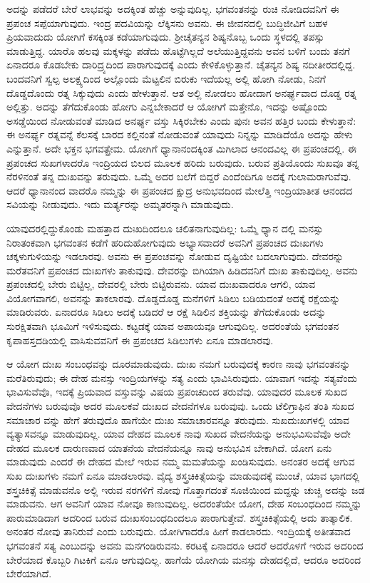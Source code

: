 ಅದನ್ನು ಪಡೆದರೆ ಬೇರೆ ಲಾಭವನ್ನು ಅದಕ್ಕಿಂತ ಹೆಚ್ಚು ಅನ್ನುವುದಿಲ್ಲ. ಭಗವಂತನನ್ನು ರುಚಿ ನೋಡಿದವನಿಗೆ ಈ ಪ್ರಪಂಚ ಸಪ್ಪೆಯಾಗುವುದು. ಇಂದ್ರ ಪದವಿಯನ್ನು ಲೆಕ್ಕಿಸನು ಅವನು. ಈ ಜೀವನದಲ್ಲಿ ಬುದ್ಧಿಜೀವಿಗೆ ಬಹಳ ಪ್ರಿಯವಾದುದು ಯೋಗಿಗೆ ಕಸಕ್ಕಿಂತ ಕಡೆಯಾಗುವುದು. ಶ‍್ರೀಚೈತನ್ಯನ ಶಿಷ್ಯನೊಬ್ಬ ಒಂದು ಸ್ಥಳದಲ್ಲಿ ತಪಸ್ಸು ಮಾಡುತ್ತಿದ್ದ. ಯಾರೊ ಹಲವು ಮಕ್ಕಳನ್ನು ಪಡೆದು ಹೊಟ್ಟೆಗಿಲ್ಲದೆ ಅಲೆಯುತ್ತಿದ್ದವನು ಅವನ ಬಳಿಗೆ ಬಂದು ತನಗೆ ಏನಾದರೂ ಕೊಡಬೇಕು ದಾರಿದ್ರ್ಯದಿಂದ ಪಾರಾಗುವುದಕ್ಕೆ ಎಂದು ಕೇಳಿಕೊಳ್ಳುತ್ತಾನೆ. ಚೈತನ್ಯನ ಶಿಷ್ಯ ನದೀತೀರದಲ್ಲಿದ್ದ. ಬಂದವನಿಗೆ ಸ್ವಲ್ಪ ಅಲಕ್ಷ್ಯದಿಂದ ಅಲ್ಲೊಂದು ಮೆಟ್ಟಲಿನ ಬಿರುಕು ಇದೆಯಲ್ಲ ಅಲ್ಲಿ ಹೋಗಿ ನೋಡು, ನಿನಗೆ ದೊಡ್ಡದೊಂದು ರತ್ನ ಸಿಕ್ಕುವುದು ಎಂದು ಹೇಳುತ್ತಾನೆ. ಆತ ಅಲ್ಲಿ ನೋಡಲು ಹೋದಾಗ ಅನರ್ಘ್ಯವಾದ ದೊಡ್ಡ ರತ್ನ ಅಲ್ಲಿತ್ತು. ಅದನ್ನು ತೆಗೆದುಕೊಂಡು ಹೋಗು ಎನ್ನಬೇಕಾದರೆ ಆ ಯೋಗಿಗೆ ಮತ್ತೇನೊ, ಇದನ್ನು ಅಷ್ಟೊಂದು ಅಸಡ್ಡೆಯಿಂದ ನೋಡುವಂತೆ ಮಾಡಿದ ಅನರ್ಘ್ಯ ವಸ್ತು ಸಿಕ್ಕಿರಬೇಕು ಎಂದು ಪುನಃ ಅವನ ಹತ್ತಿರ ಬಂದು ಕೇಳುತ್ತಾನೆ: ಈ ಅನರ್ಘ್ಯ ರತ್ನವನ್ನೆ ಕೆಲಸಕ್ಕೆ ಬಾರದ ಕಲ್ಲಿನಂತೆ ನೋಡುವಂತೆ ಯಾವುದು ನಿನ್ನನ್ನು ಮಾಡಿದೆಯೊ ಅದನ್ನು ಹೇಳು ಎನ್ನುತ್ತಾನೆ. ಅದೇ ಭಕ್ತನ ಭಗವತ್ಪ್ರೇಮ. ಯೋಗಿಗೆ ಧ್ಯಾನಾನಂದಕ್ಕಿಂತ ಮಿಗಿಲಾದ ಆನಂದವಿಲ್ಲ ಈ ಪ್ರಪಂಚದಲ್ಲಿ. ಈ ಪ್ರಪಂಚದ ಸುಖಗಳಾದರೊ ಇಂದ್ರಿಯದ ಬಿಲದ ಮೂಲಕ ಹರಿದು ಬರುವುದು. ಬರುವ ಪ್ರತಿಯೊಂದು ಸುಖವೂ ತನ್ನ ನೆರಳಿನಂತೆ ತನ್ನ ದುಃಖವನ್ನು ತರುವುದು. ಒಮ್ಮೆ ಅದರ ಬಲೆಗೆ ಬಿದ್ದರೆ ಎಂದೆಂದಿಗೂ ಅದಕ್ಕೆ ಗುಲಾಮರಾಗುವೆವು. ಆದರೆ ಧ್ಯಾನಾನಂದ ವಾದರೊ ನಮ್ಮನ್ನು ಈ ಪ್ರಪಂಚದ ಕ್ಷುದ್ರ ಅನುಭವದಿಂದ ಮೇಲೆತ್ತಿ ಇಂದ್ರಿಯಾತೀತ ಆನಂದದ ಸವಿಯನ್ನು ನೀಡುವುದು. ಇದು ಮರ್ತ್ಯರನ್ನು ಅಮೃತರನ್ನಾಗಿ ಮಾಡುವುದು.

ಯಾವುದರಲ್ಲಿದ್ದುಕೊಂಡು ಮಹತ್ತಾದ ದುಃಖದಿಂದಲೂ ಚಲಿತನಾಗುವುದಿಲ್ಲ: ಒಮ್ಮೆ ಧ್ಯಾನ ದಲ್ಲಿ ಮನಸ್ಸು ನಿರಾತಂಕವಾಗಿ ಭಗವಂತನ ಕಡೆಗೆ ಹರಿದುಹೋಗುವುದು ಅಭ್ಯಾಸವಾದರೆ ಅವನಿಗೆ ಪ್ರಪಂಚದ ದುಃಖಗಳು ಚಕ್ಕಳುಗುಳಿಯನ್ನು ಇಡಲಾರವು. ಅವನು ಈ ಪ್ರಪಂಚವನ್ನು ನೋಡುವ ದೃಷ್ಟಿಯೇ ಬದಲಾಗುವುದು. ದೇವರನ್ನು ಮರೆತವನಿಗೆ ಪ್ರಪಂಚದ ದುಃಖಗಳು ತಾಕುವುವು. ದೇವರನ್ನು ಬಿಗಿಯಾಗಿ ಹಿಡಿದವನಿಗೆ ದುಃಖ ತಾಕುವುದಿಲ್ಲ. ಅವನು ಪ್ರಪಂಚದಲ್ಲಿ ಬೇರು ಬಿಟ್ಟಿಲ್ಲ, ದೇವರಲ್ಲಿ ಬೇರು ಬಿಟ್ಟಿರುವನು. ಯಾವ ದುಃಖವಾದರೂ ಆಗಲಿ, ಯಾವ ವಿಯೋಗವಾಗಲಿ, ಅವನನ್ನು ತಾಕಲಾರವು. ದೊಡ್ಡದೊಡ್ಡ ಮನೆಗಳಿಗೆ ಸಿಡಿಲು ಬಡಿಯದಂತೆ ಅದಕ್ಕೆ ರಕ್ಷೆಯನ್ನು ಮಾಡಿರುವರು. ಏನಾದರೂ ಸಿಡಿಲು ಅದಕ್ಕೆ ಬಡಿದರೆ ಆ ರಕ್ಷೆ ಸಿಡಿಲಿನ ಶಕ್ತಿಯನ್ನು ತೆಗೆದುಕೊಂಡು ಅದನ್ನು ಸುರಕ್ಷಿತವಾಗಿ ಭೂಮಿಗೆ ಇಳಿಸುವುದು. ಕಟ್ಟಡಕ್ಕೆ ಯಾವ ಅಪಾಯವೂ ಆಗುವುದಿಲ್ಲ. ಅದರಂತೆಯೆ ಭಗವಂತನ ಕೃಪಾಹಸ್ತದಡಿಯಲ್ಲಿ ವಾಸಿಸುವವನಿಗೆ ಈ ಪ್ರಪಂಚದ ಸಿಡಿಲುಗಳು ಏನೂ ಮಾಡಲಾರವು.

ಆ ಯೋಗ ದುಃಖ ಸಂಬಂಧವನ್ನು ದೂರಮಾಡುವುದು. ದುಃಖ ನಮಗೆ ಬರುವುದಕ್ಕೆ ಕಾರಣ ನಾವು ಭಗವಂತನನ್ನು ಮರೆತಿರುವುದು; ಈ ದೇಹ ಮನಸ್ಸು ಇಂದ್ರಿಯಗಳನ್ನು ಸತ್ಯ ಎಂದು ಭಾವಿಸಿರುವುದು. ಯಾವಾಗ ಇದನ್ನು ಸತ್ಯವೆಂದು ಭಾವಿಸುವೆವೊ, ಇದಕ್ಕೆ ಪ್ರಿಯವಾದ ವಸ್ತುವನ್ನು ವಿಷಯ ಪ್ರಪಂಚದಿಂದ ತರುವೆವು. ಯಾವುದರ ಮೂಲಕ ಸುಖದ ವೇದನೆಗಳು ಬರುವುವೊ ಅದರ ಮೂಲಕವೆ ದುಃಖದ ವೇದನೆಗಳೂ ಬರುವುವು. ಒಂದು ಟೆಲಿಗ್ರಾಫಿನ ತಂತಿ ಸುಖದ ಸಮಾಚಾರ ವನ್ನು ಹೇಗೆ ತರುವುದೊ ಹಾಗೆಯೇ ದುಃಖ ಸಮಾಚಾರವನ್ನೂ ತರುವುದು. ಸುಖದುಃಖಗಳಲ್ಲಿ ಯಾವ ವ್ಯತ್ಯಾಸವನ್ನೂ ಮಾಡುವುದಿಲ್ಲ. ಯಾವ ದೇಹದ ಮೂಲಕ ನಾವು ಸುಖದ ವೇದನೆಯನ್ನು ಅನುಭವಿಸುವೆವೊ ಅದೇ ದೇಹದ ಮೂಲಕ ದಾರುಣವಾದ ಯಾತನೆಯ ವೇದನೆಯನ್ನೂ ನಾವು ಅನುಭವಿಸ ಬೇಕಾಗಿದೆ. ಯೋಗ ಏನು ಮಾಡುವುದು ಎಂದರೆ ಈ ದೇಹದ ಮೇಲೆ ಇರುವ ನಮ್ಮ ಮಮತೆಯನ್ನು ಖಂಡಿಸುವುದು. ಅನಂತರ ಅದಕ್ಕೆ ಆಗುವ ಸುಖ ದುಃಖಗಳು ನಮಗೆ ಏನೂ ಮಾಡಲಾರವು. ವೈದ್ಯ ಶಸ್ತ್ರಚಿಕಿತ್ಸೆಯನ್ನು ಮಾಡುವುದಕ್ಕೆ ಮುಂಚೆ, ಯಾವ ಭಾಗದಲ್ಲಿ ಶಸ್ತ್ರಚಿಕಿತ್ಸೆ ಮಾಡುವನೊ ಅಲ್ಲಿ ಇರುವ ನರಗಳಿಗೆ ನೋವು ಗೊತ್ತಾಗದಂತೆ ಸೂಜಿಯಿಂದ ಮದ್ದನ್ನು ಚುಚ್ಚಿ ಅದನ್ನು ಜಡ ಮಾಡುವನು. ಆಗ ಅವನಿಗೆ ಯಾವ ನೋವೂ ಕಾಣುವುದಿಲ್ಲ. ಅದರಂತೆಯೇ ಯೋಗ, ದೇಹ ಸಂಬಂಧದಿಂದ ನಮ್ಮನ್ನು ಪಾರುಮಾಡಿದಾಗ ಅದರಿಂದ ಬರುವ ದುಃಖಸಂಬಂಧದಿಂದಲೂ ಪಾರಾಗುತ್ತೇವೆ. ಶಸ್ತ್ರಚಿಕಿತ್ಸೆಯಲ್ಲಿ ಅದು ತಾತ್ಕಾಲಿಕ. ಅನಂತರ ನೋವು ತಾನಿರುವೆ ಎಂದು ಬರುವುದು. ಯೋಗಿಗಾದರೊ ಹೀಗೆ ಕಾಡಲಾರದು. ಇಂದ್ರಿಯಕ್ಕೆ ಅತೀತವಾದ ಭಗವಂತನೆ ಸತ್ಯ ಎಂಬುದನ್ನು ಅವನು ಮನಗಂಡಿರುವನು. ಕರಟಕ್ಕೆ ಏನಾದರೂ ಆದರೆ ಅದರೊಳಗೆ ಇರುವ ಅದರಿಂದ ಬೇರೆಯಾದ ಕೊಬ್ಬರಿ ಗಿಟಕಿಗೆ ಏನೂ ಆಗುವುದಿಲ್ಲ. ಹಾಗೆಯೆ ಯೋಗಿಯ ಮನಸ್ಸು ದೇಹದಲ್ಲಿದೆ, ಆದರೂ ಅದರಿಂದ ಬೇರೆಯಾಗಿದೆ.

